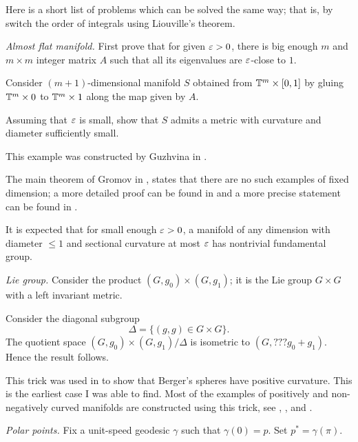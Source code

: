  Here is a short list of problems which can be solved the same way; that is, by switch the order of integrals using Liouville's theorem.








\textit{Almost flat manifold.}
First prove that for given $\varepsilon>0$, 
there is big enough $m$ and $m\times m$ integer matrix 
$A$ such that all its eigenvalues are $\varepsilon$-close to $1$. 

Consider $(m+1)$-dimensional manifold $S$ obtained from $\mathbb{T}^m\times [0,1]$ by gluing $\mathbb{T}^m\times 0$ to $\mathbb{T}^m\times 1$ along the map given by $A$.

Assuming that $\varepsilon$ is small,
show that $S$ admits a metric with curvature and diameter sufficiently small.

This example was constructed by Guzhvina in \cite{guzhvina}.

The main theorem of Gromov in \cite{gromov-almost-flat}, 
states that there are no such examples of fixed dimension;
a more detailed proof can be found in \cite{buser-karcher}
and a more precise statement can be found in \cite{ruh}.

It is expected that for small enough $\varepsilon>0$,
a manifold of any dimension 
with diameter $\le 1$ and sectional
curvature at most $\varepsilon$ 
has nontrivial fundamental group.


\textit{Lie group.} 
Consider the product $(G,g_0)\times (G,g_1)$;
it is the Lie group $G\times G$ with a left invariant metric.

Consider the diagonal subgroup 
\[\Delta= \{(g,g)\in G\times G\}.\]
The quotient space $(G,g_0)\times (G,g_1)/\Delta$
is isometric to $(G,???g_0+g_1)$.
Hence the result follows.

This trick was used in \cite{GKM} to show that Berger's spheres have positive curvature.
This is the earliest case I was able to find. 
Most of the examples of positively and non-negatively curved manifolds are constructed using this trick,
see \cite{aloff-wallach}, \cite{gromoll-meyer}, \cite{eschenburg-spaces} and \cite{bazajkin}.




\textit{Polar points.}
Fix a unit-speed geodesic $\gamma$ such that $\gamma(0)=p$.
Set $p^*=\gamma(\pi)$.

